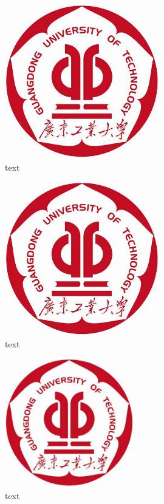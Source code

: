 \begin{figure}[h]
    \centering
    \includegraphics[width=0.6\textwidth]{figures/logo.png}
    \caption{text}
\end{figure}

\begin{figure}[h]
    \centering
    \includegraphics[width=0.6\textwidth]{figures/logo.png}
    \caption{text}
\end{figure}

\begin{figure}[h]
    \centering
    \includegraphics[width=0.5\textwidth]{figures/logo.png}
    \caption{text}
\end{figure}

